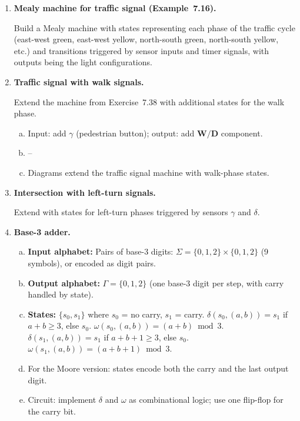 \begin{enumerate}[{7.}1.]
\item \textbf{Mealy machine for traffic signal (Example~7.16).}

Build a Mealy machine with states representing each phase of the traffic cycle (east-west green, east-west yellow, north-south green, north-south yellow, etc.) and transitions triggered by sensor inputs and timer signals, with outputs being the light configurations.

\item \textbf{Traffic signal with walk signals.}

Extend the machine from Exercise~7.38 with additional states for the walk phase.

\begin{enumerate}[(a)]
  \item Input: add $\gamma$ (pedestrian button); output: add $\pmb{W}/\pmb{D}$ component.
  \item--\item[c.] Diagrams extend the traffic signal machine with walk-phase states.
\end{enumerate}

\item \textbf{Intersection with left-turn signals.}

Extend with states for left-turn phases triggered by sensors $\gamma$ and $\delta$.

\item \textbf{Base-3 adder.}

\begin{enumerate}[(a)]
  \item \textbf{Input alphabet:} Pairs of base-3 digits: $\Sigma=\{0,1,2\}\times\{0,1,2\}$ (9 symbols), or encoded as digit pairs.
  \item \textbf{Output alphabet:} $\Gamma=\{0,1,2\}$ (one base-3 digit per step, with carry handled by state).
  \item \textbf{States:} $\{s_0,s_1\}$ where $s_0$ = no carry, $s_1$ = carry.
  $\delta(s_0,(a,b))=s_1$ if $a+b\ge 3$, else $s_0$.
  $\omega(s_0,(a,b))=(a+b)\bmod 3$.
  $\delta(s_1,(a,b))=s_1$ if $a+b+1\ge 3$, else $s_0$.
  $\omega(s_1,(a,b))=(a+b+1)\bmod 3$.
  \item For the Moore version: states encode both the carry and the last output digit.
  \item Circuit: implement $\delta$ and $\omega$ as combinational logic; use one flip-flop for the carry bit.
\end{enumerate}


\end{enumerate}
